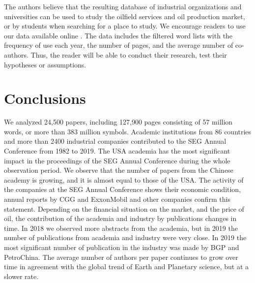 \documentclass[geosciences,article,submit,moreauthors,pdftex]{Definitions/mdpi}
\begin{document}
The authors believe that the resulting database of industrial organizations and universities can be used to study the oilfield services and oil production market, or by students when searching for a place to study. We encourage readers to use our data available online \citep{Eltsov2020}. The data includes the filtered word lists with the frequency of use each year, the number of pages, and the average number of co-authors. Thus, the reader will be able to conduct their research, test their hypotheses or assumptions.



\section{Conclusions}

We analyzed 24,500 papers, including 127,900 pages consisting of 57 million words, or more than 383 million symbols. Academic institutions from 86 countries and more than 2400 industrial companies contributed to the SEG Annual Conference from 1982 to 2019. The USA academia has the most significant impact in the proceedings of the SEG Annual Conference during the whole observation period. We observe that the number of papers from the Chinese academy is growing, and it is almost equal to those of the USA. The activity of the companies at the SEG Annual Conference shows their economic condition, annual reports by CGG and ExxonMobil and other companies confirm this statement. Depending on the financial situation on the market, and the price of oil, the contribution of the academia and industry by publications changes in time. In 2018 we observed more abstracts from the academia, but in 2019 the number of publications from academia and industry were very close. In 2019 the most significant number of publication in the industry was made by BGP and PetroChina. The average number of authors per paper continues to grow over time in agreement with the global trend of Earth and Planetary science, but at a slower rate.
\end{document}
